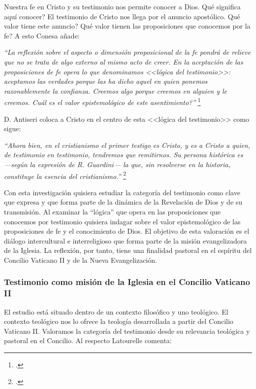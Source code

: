\documentclass[../main.tex]{subfiles}
\begin{document}
Nuestra fe en Cristo y su testimonio nos permite conocer a Dios. \textquestiondown{}{}Qué significa aquí conocer? El testimonio de Cristo nos llega por el anuncio apostólico. \textquestiondown{}{}Qué valor tiene este anuncio? \textquestiondown{}{}Qué valor tienen las proposiciones que conocemos por la fe? A esto Conesa añade:

\emph{
``La reflexión sobre el aspecto o dimensión proposicional de la fe pondrá de relieve que no se trata de algo externo al mismo acto de creer. En la aceptación de las proposiciones de fe opera lo que denominamos <<lógica del testimonio>>: aceptamos las verdades porque las ha dicho aquel en quien ponemos razonablemente la confianza. Creemos algo porque creemos en alguien y le creemos. \textquestiondown{}{}Cuál es el valor epistemológico de este asentimiento?''
}\footcite[p.483]{feylogicaconesa}

D. Antiseri coloca a Cristo en el centro de esta <<lógica del testimonio>> como sigue:

\emph{
``Ahora bien, en el cristianismo el primer testigo es Cristo, y es a Cristo a quien, de testimonio en testimonio, tendremos que remitirnos. Su persona histórica es ---según la expresión de R. Guardini--- la que, sin resolverse en la historia, constituye la esencia del cristianismo.''
}\footcite[168]{antiseri}

Con esta investigación quisiera estudiar la categoría del testimonio como clave que expresa y que forma parte de la dinámica de la Revelación de Dios y de su transmisión. Al examinar la ``lógica'' que opera en las proposiciones que conocemos por testimonio quisiera indagar sobre el valor epistemológico de las proposiciones de fe y el conocimiento de Dios. El objetivo de esta valoración es el diálogo intercultural e interreligioso que forma parte de la misión evangelizadora de la Iglesia. La reflexión, por tanto, tiene una finalidad pastoral en el espíritu del Concilio Vaticano II y de la Nueva Evangelización.

\subsubsection{Testimonio como misión de la Iglesia en el Concilio Vaticano II}

El estudio está situado dentro de un contexto filosófico y uno teológico. El contexto teológico nos lo ofrece la teología desarrollada a partir del Concilio Vaticano II. Valoramos la categoría del testimonio desde su relevancia teológica y pastoral en el Concilio. Al respecto Latourelle comenta:
\end{document}
